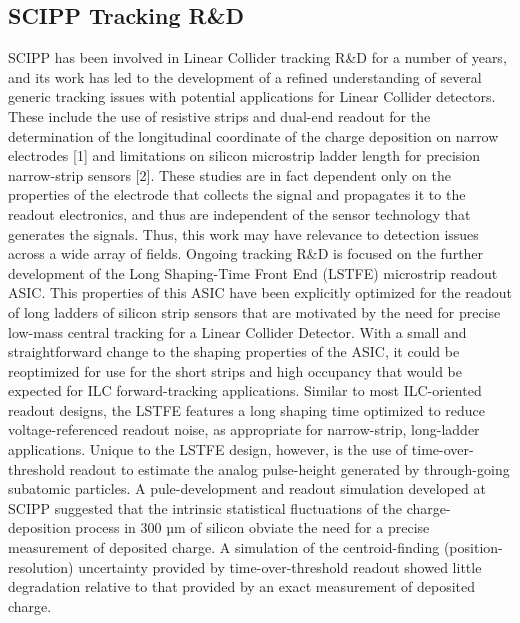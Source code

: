 \subsection{SCIPP Tracking R\&D}
SCIPP has been involved in Linear Collider tracking R\&D for a number of years, and its work has led to the development of a refined understanding of several generic tracking issues with potential applications for Linear Collider detectors. These include the use of resistive strips and dual-end readout for the determination of the longitudinal coordinate of the charge deposition on narrow electrodes [1] and limitations on silicon microstrip ladder length for precision narrow-strip sensors [2]. These studies are in fact dependent only on the properties of the electrode that collects the signal and propagates it to the readout electronics, and thus are independent of the sensor technology that generates the signals. Thus, this work may have relevance to detection issues across a wide array of fields.
Ongoing tracking R\&D is focused on the further development of the Long Shaping-Time Front End (LSTFE) microstrip readout ASIC. This properties of this ASIC have been explicitly optimized for the readout of long ladders of silicon strip sensors that are motivated by the need for precise low-mass central tracking for a Linear Collider Detector. With a small and straightforward change to the shaping properties of the ASIC, it could be reoptimized for use for the short strips and high occupancy that would be expected for ILC forward-tracking applications.
Similar to most ILC-oriented readout designs, the LSTFE features a long shaping time optimized to reduce voltage-referenced readout noise, as appropriate for narrow-strip, long-ladder applications. Unique to the LSTFE design, however, is the use of time-over-threshold readout to estimate the analog pulse-height generated by through-going subatomic particles. A pule-development and readout simulation developed at SCIPP suggested that the intrinsic statistical fluctuations of the charge-deposition process in 300 µm of silicon obviate the need for a precise measurement of deposited charge. A simulation of the centroid-finding (position-resolution) uncertainty provided by time-over-threshold readout showed little degradation relative to that provided by an exact measurement of deposited charge.
